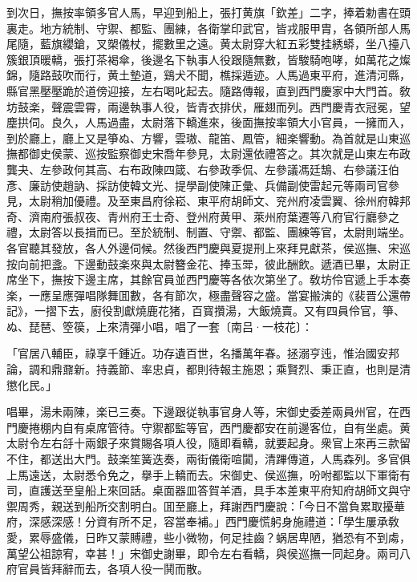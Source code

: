 到次日，撫按率領多官人馬，早迎到船上，張打黄旗「欽差」二字，捧着勅書在頭裏走。地方統制、守禦、都監、團練，各衛掌印武官，皆戎服甲胄，各領所部人馬尾隨，藍旗纓鎗，叉槊儀杖，擺數里之遠。黄太尉穿大紅五彩雙挂綉蟒，坐八擡八簇銀頂暖轎，張打茶褐傘，後邊名下執事人役跟隨無數，皆駿騎咆哮，如萬花之燦錦，隨路鼓吹而行，黄土墊道，鷄犬不聞，樵採遁迹。人馬過東平府，進清河縣，縣官黑壓壓跪於道傍迎接，左右喝叱起去。隨路傳報，直到西門慶家中大門首。敎坊鼓楽，聲震雲霄，兩邊執事人役，皆青衣排伏，雁翅而列。西門慶青衣冠冕，望塵拱伺。良久，人馬過盡，太尉落下轎進來，後面撫按率領大小官員，一擁而入，到於廳上，廳上又是箏ぬ、方響，雲璈、龍笛、鳳管，細楽響動。為首就是山東巡撫都御史侯蒙、巡按監察御史宋喬年參見，太尉還依禮答之。其次就是山東左布政龔夬、左參政何其高、右布政陳四箴、右參政季侃、左參議馮廷鵠、右參議汪伯彥、廉訪使趙訥、採訪使韓文光、提學副使陳正彙、兵備副使雷起元等兩司官參見，太尉稍加優禮。及至東昌府徐崧、東平府胡師文、兖州府凌雲翼、徐州府韓邦奇、濟南府張叔夜、青州府王士奇、登州府黄甲、萊州府葉遷等八府官行廳參之禮，太尉答以長揖而已。至於統制、制置、守禦、都監、團練等官，太尉則端坐。各官聽其發放，各人外邊伺候。然後西門慶與夏提刑上來拜見獻茶，侯巡撫、宋巡按向前把盞。下邊動鼓楽來與太尉簪金花、捧玉斝，彼此酬飲。遞酒已畢，太尉正席坐下，撫按下邊主席，其餘官員並西門慶等各依次第坐了。敎坊伶官遞上手本奏楽，一應呈應彈唱隊舞囬數，各有節次，極盡聲容之盛。當宴搬演的《裴晋公還帶記》，一摺下去，廚役割獻燒鹿花猪，百寳攢湯，大飯燒賣。又有四員伶官，箏、ぬ、琵琶、箜篌，上來清彈小唱，唱了一套〔南吕·一枝花〕：

\begin{myquote}
「官居八輔臣，祿享千鍾近。功存遺百世，名播萬年春。拯溺亨迍，惟治國安邦論，調和鼎鼐新。持義節、率忠貞，都則待報主施恩；乘賢烈、秉正直，也則是清懲化民。」
\end{myquote}

唱畢，湯未兩陳，楽已三奏。下邊跟従執事官身人等，宋御史委差兩員州官，在西門慶捲棚内自有桌席管待。守禦都監等官，西門慶都安在前邊客位，自有坐處。黄太尉令左右㧱十兩銀子來賞賜各項人役，隨即看轎，就要起身。衆官上來再三款留不住，都送出大門。鼓楽笙簧迭奏，兩街儀衛喧闐，清蹕傳道，人馬森列。多官俱上馬遠送，太尉悉令免之，擧手上轎而去。宋御史、侯巡撫，吩咐都監以下軍衛有司，直護送至皇船上來回話。桌面器皿答賀羊酒，具手本差東平府知府胡師文與守禦周秀，親送到船所交割明白。囬至廳上，拜謝西門慶說：「今日不當負累取擾華府，深感深感！分資有所不足，容當奉補。」西門慶慌躬身施禮道：「學生屢承敎愛，累辱盛儀，日昨又蒙賻禮，些小微物，何足挂齒？蜗居卑陋，猶恐有不到䖏，萬望公祖諒宥，幸甚！」宋御史謝畢，即令左右看轎，與侯巡撫一同起身。兩司八府官員皆拜辭而去，各項人役一鬨而散。

